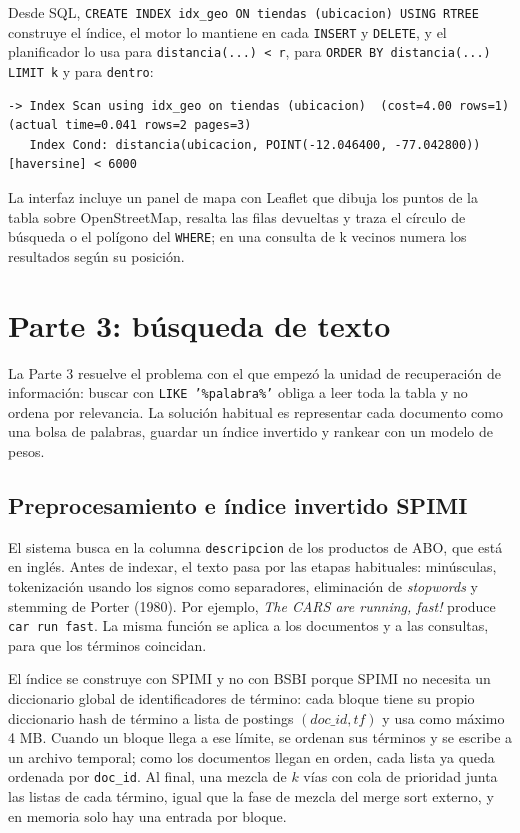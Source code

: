 \documentclass[11pt,a4paper]{article}
\begin{document}
Desde SQL, \texttt{CREATE INDEX idx\_geo ON tiendas (ubicacion) USING RTREE} construye el índice, el motor lo mantiene en cada \texttt{INSERT} y \texttt{DELETE}, y el planificador lo usa para \texttt{distancia(...) < r}, para \texttt{ORDER BY distancia(...) LIMIT k} y para \texttt{dentro}:

\begin{lstlisting}
-> Index Scan using idx_geo on tiendas (ubicacion)  (cost=4.00 rows=1) (actual time=0.041 rows=2 pages=3)
   Index Cond: distancia(ubicacion, POINT(-12.046400, -77.042800)) [haversine] < 6000
\end{lstlisting}

La interfaz incluye un panel de mapa con Leaflet que dibuja los puntos de la tabla sobre OpenStreetMap, resalta las filas devueltas y traza el círculo de búsqueda o el polígono del \texttt{WHERE}; en una consulta de k vecinos numera los resultados según su posición.

\section{Parte 3: búsqueda de texto}

La Parte 3 resuelve el problema con el que empezó la unidad de recuperación de información: buscar con \texttt{LIKE '\%palabra\%'} obliga a leer toda la tabla y no ordena por relevancia. La solución habitual es representar cada documento como una bolsa de palabras, guardar un índice invertido y rankear con un modelo de pesos.

\subsection{Preprocesamiento e índice invertido SPIMI}

El sistema busca en la columna \texttt{descripcion} de los productos de ABO, que está en inglés. Antes de indexar, el texto pasa por las etapas habituales: minúsculas, tokenización usando los signos como separadores, eliminación de \emph{stopwords} y stemming de Porter (1980). Por ejemplo, \emph{The CARS are running, fast!} produce \texttt{car run fast}. La misma función se aplica a los documentos y a las consultas, para que los términos coincidan.

El índice se construye con SPIMI y no con BSBI porque SPIMI no necesita un diccionario global de identificadores de término: cada bloque tiene su propio diccionario hash de término a lista de postings $(\mathit{doc\_id}, \mathit{tf})$ y usa como máximo 4 MB. Cuando un bloque llega a ese límite, se ordenan sus términos y se escribe a un archivo temporal; como los documentos llegan en orden, cada lista ya queda ordenada por \texttt{doc\_id}. Al final, una mezcla de $k$ vías con cola de prioridad junta las listas de cada término, igual que la fase de mezcla del merge sort externo, y en memoria solo hay una entrada por bloque.
\end{document}
